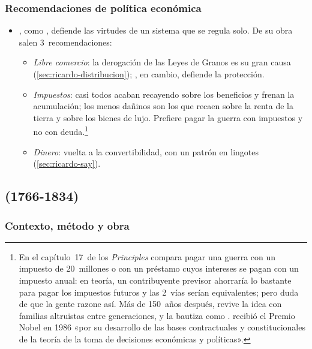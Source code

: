 \documentclass[11pt]{article}
\begin{document}
\subsubsection{Recomendaciones de política económica}\label{sec:ricardo-politica}

\begin{itemize}
\item {}, como , defiende las virtudes de un sistema que se regula solo. De su obra salen 3~recomendaciones:
  \begin{itemize}
  \item \emph{Libre comercio}: la derogación de las Leyes de Granos es su gran causa (\ref{sec:ricardo-distribucion}); , en cambio, defiende la protección.
  \item \emph{Impuestos}: casi todos acaban recayendo sobre los beneficios y frenan la acumulación; los menos dañinos son los que recaen sobre la renta de la tierra y sobre los bienes de lujo. Prefiere pagar la guerra con impuestos y no con deuda.\footnote{En el capítulo~17~de los \emph{Principles} compara pagar una guerra con un impuesto de 20~millones o con un préstamo cuyos intereses se pagan con un impuesto anual: en teoría, un contribuyente previsor ahorraría lo bastante para pagar los impuestos futuros y las 2~vías serían equivalentes; pero  duda de que la gente razone así\nocite{Ricardo1821Principles}. Más de 150~años después, \textcite{Barro1974} revive la idea con familias altruistas entre generaciones, y \textcite{Buchanan1976Barro} la bautiza como  .  recibió el Premio Nobel en 1986 «por su desarrollo de las bases contractuales y constitucionales de la teoría de la toma de decisiones económicas y políticas»\nocite{Nobel1986Buchanan}.}
  \item \emph{Dinero}: vuelta a la convertibilidad, con un patrón en lingotes (\ref{sec:ricardo-say}).
  \end{itemize}
\end{itemize}

\subsection{ (1766-1834)}\label{sec:malthus}

\subsubsection{Contexto, método y obra}\label{sec:malthus-contexto}
\end{document}

